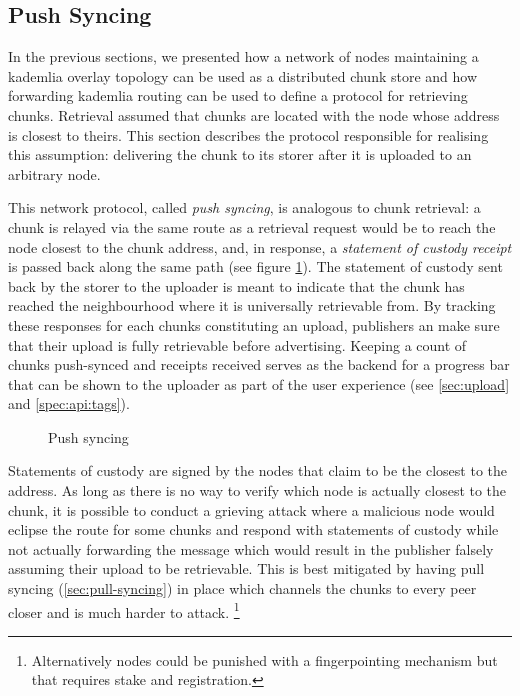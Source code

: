 \subsection{Push Syncing}\label{sec:syncing}
 
In the previous sections, we presented how a network of nodes maintaining a kademlia overlay topology can be used as a distributed chunk store and how forwarding kademlia routing can be used to define a  protocol for retrieving chunks.
Retrieval assumed that chunks are located with the node whose address is closest to theirs. This section describes the protocol responsible for realising this assumption: delivering the chunk to its storer after it is uploaded to an arbitrary node.

This network protocol, called \emph{push syncing}, is analogous to chunk retrieval: a chunk is relayed via the same route as a retrieval request would be to reach the node closest to the chunk address, and, in response, a \emph{statement of custody receipt} is passed back along the same path  (see figure \ref{fig:push-syncing}). The statement of custody sent back by the storer to the uploader is meant to indicate that the chunk has reached the neighbourhood where it is universally retrievable from. By tracking these responses for each chunks constituting an upload, publishers an make sure that their upload is fully retrievable before advertising. Keeping a  count  of chunks push-synced and receipts received serves as the backend for a progress bar that can be shown to the uploader as part of the user experience (see \ref{sec:upload} and \ref{spec:api:tags}).


\begin{figure}[htbp]
   \centering
   \caption{Push syncing}
   \label{fig:push-syncing}
\end{figure}

Statements of custody are signed by the nodes that claim to be the closest to the address. As long as there is no way to verify  which node is actually closest to the chunk, it is possible to conduct a grieving attack where a malicious node would eclipse the route for some chunks and respond with statements of custody while not actually forwarding the message which would result in the publisher falsely assuming their upload to be retrievable. This is best mitigated by having pull syncing (\ref{sec:pull-syncing}) in place which channels the chunks to every peer closer and is much harder to attack.%
%
\footnote{Alternatively nodes could be punished with a fingerpointing mechanism but that requires stake and registration.}

